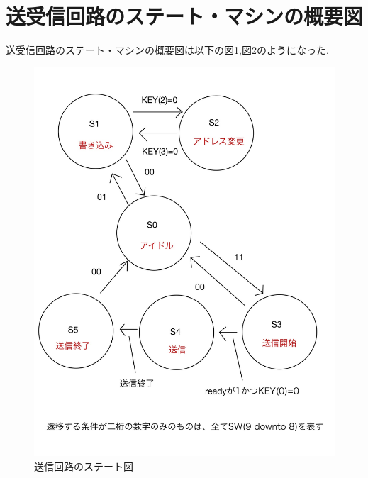 \documentclass[dvipdfmx]{jarticle}
\begin{document}
\section{送受信回路のステート・マシンの概要図}
送受信回路のステート・マシンの概要図は以下の図1,図2のようになった.
\begin{figure}[h]
    \begin{minipage}[b]{0.45\linewidth}
      \centering
      \includegraphics[keepaspectratio, scale=0.1]{state_serve.jpg}
      \caption{送信回路のステート図}
    \end{minipage}
    \begin{minipage}[b]{0.45\linewidth}
      \centering

\end{minipage}
\end{figure}
\end{document}
